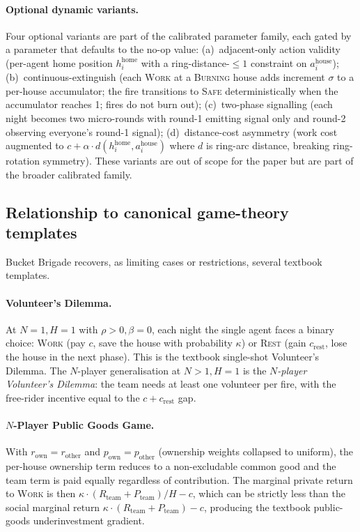 \documentclass{anvil-paper}
\begin{document}
\paragraph{Optional dynamic variants.}
Four optional variants are part of the calibrated parameter family, each
gated by a parameter that defaults to the no-op value: (a)~adjacent-only
action validity (per-agent home position $h^{\text{home}}_i$ with a
ring-distance-${\leq}1$ constraint on $a_i^{\text{house}}$);
(b)~continuous-extinguish (each \textsc{Work} at a \textsc{Burning} house
adds increment $\sigma$ to a per-house accumulator; the fire transitions
to \textsc{Safe} deterministically when the accumulator reaches 1; fires
do not burn out); (c)~two-phase signalling (each night becomes two
micro-rounds with round-1 emitting signal only and round-2 observing
everyone's round-1 signal); (d)~distance-cost asymmetry (work cost
augmented to $c+\alpha\cdot d(h^{\text{home}}_i,a_i^{\text{house}})$
where $d$ is ring-arc distance, breaking ring-rotation symmetry).
These variants are out of scope for the paper but are part of the broader
calibrated family.

\subsection{Relationship to canonical game-theory templates}
\label{app:envspec:templates}

Bucket Brigade recovers, as limiting cases or restrictions, several
textbook templates.

\paragraph{Volunteer's Dilemma.}
At $N{=}1,H{=}1$ with $\rho>0,\beta{=}0$, each night the single agent
faces a binary choice: \textsc{Work} (pay $c$, save the house with
probability $\kappa$) or \textsc{Rest} (gain $c_{\text{rest}}$, lose the
house in the next phase). This is the textbook single-shot Volunteer's
Dilemma. The $N$-player generalisation at $N>1,H=1$ is the
\emph{$N$-player Volunteer's Dilemma}: the team needs at least one
volunteer per fire, with the free-rider incentive equal to the
$c+c_{\text{rest}}$ gap.

\paragraph{$N$-Player Public Goods Game.}
With $r_{\text{own}}=r_{\text{other}}$ and $p_{\text{own}}=p_{\text{other}}$
(ownership weights collapsed to uniform), the per-house ownership term
reduces to a non-excludable common good and the team term is paid equally
regardless of contribution. The marginal private return to \textsc{Work}
is then $\kappa\cdot(R_{\text{team}}+P_{\text{team}})/H-c$, which can be
strictly less than the social marginal return $\kappa\cdot
(R_{\text{team}}+P_{\text{team}})-c$, producing the textbook public-goods
underinvestment gradient.
\end{document}
